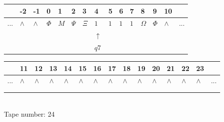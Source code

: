 \documentclass[11pt]{article}
\begin{document}
\begin{table}[H]
\centering
\begin{tabular}{lllllllllllllll}
 & -2 & -1 & 0 & 1 & 2 & 3 & 4 & 5 & 6 & 7 & 8 & 9 & 10 & \\
\hline
$...$ & \multicolumn{1}{|l|}{$\wedge$} & \multicolumn{1}{|l|}{$\wedge$} & \multicolumn{1}{|l|}{$\Phi$} & \multicolumn{1}{|l|}{$M$} & \multicolumn{1}{|l|}{$\Psi$} & \multicolumn{1}{|l|}{$\Xi$} & \multicolumn{1}{|l|}{$1$} & \multicolumn{1}{|l|}{$1$} & \multicolumn{1}{|l|}{$1$} & \multicolumn{1}{|l|}{$1$} & \multicolumn{1}{|l|}{$\Omega$} & \multicolumn{1}{|l|}{$\Phi$} & \multicolumn{1}{|l|}{$\wedge$} & $...$\\
\hline
&  &  &  &  &  &  & $\uparrow$ &  &  &  &  &  &  &  \\
&  &  &  &  &  &  & $ q7 $ &  &  &  &  &  &  &  \\
\end{tabular}
\begin{tabular}{lllllllllllllll}
 & 11 & 12 & 13 & 14 & 15 & 16 & 17 & 18 & 19 & 20 & 21 & 22 & 23 & \\
\hline
$...$ & \multicolumn{1}{|l|}{$\wedge$} & \multicolumn{1}{|l|}{$\wedge$} & \multicolumn{1}{|l|}{$\wedge$} & \multicolumn{1}{|l|}{$\wedge$} & \multicolumn{1}{|l|}{$\wedge$} & \multicolumn{1}{|l|}{$\wedge$} & \multicolumn{1}{|l|}{$\wedge$} & \multicolumn{1}{|l|}{$\wedge$} & \multicolumn{1}{|l|}{$\wedge$} & \multicolumn{1}{|l|}{$\wedge$} & \multicolumn{1}{|l|}{$\wedge$} & \multicolumn{1}{|l|}{$\wedge$} & \multicolumn{1}{|l|}{$\wedge$} & $...$\\
\hline
&  &  &  &  &  &  &  &  &  &  &  &  &  &  \\
&  &  &  &  &  &  &  &  &  &  &  &  &  &  \\
\end{tabular}
\\
Tape number: 24
\noindent\makebox[\linewidth]{\hdashrule{\textwidth}{1pt}{1pt}}\end{table}
\end{document}
